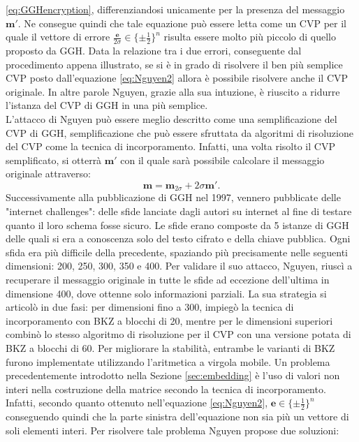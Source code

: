 \ref{eq:GGHencryption}, differenziandosi unicamente per la presenza del messaggio $\mathbf{m}'$.
Ne consegue quindi che tale equazione può essere letta come un CVP per il quale il vettore di 
errore $\frac{\mathbf{e}}{2\sigma} \in \{\pm\frac{1}{2}\}^n$ risulta essere molto più piccolo
di quello proposto da GGH. Data la relazione tra i due errori, conseguente dal procedimento appena
illustrato, se si è in grado di risolvere il ben più semplice CVP posto dall'equazione 
\ref{eq:Nguyen2} allora è possibile risolvere anche il CVP originale. In altre parole 
Nguyen, grazie alla sua intuzione, è riuscito a ridurre l'istanza del CVP di GGH in una più
semplice. \\
L'attacco di Nguyen può essere meglio descritto come una semplificazione del CVP di GGH, 
semplificazione che può essere sfruttata da algoritmi di risoluzione del CVP come la 
tecnica di incorporamento. Infatti, una volta risolto il CVP semplificato, si otterrà 
$\mathbf{m}'$ con il quale sarà possibile calcolare il messaggio originale attraverso: 
\[
    \mathbf{m} = \mathbf{m}_{2\sigma} + 2\sigma\mathbf{m}'.
\] 
Successivamente alla pubblicazione di GGH nel 1997, vennero
pubblicate delle "internet challenges": delle sfide lanciate dagli autori su internet
al fine di testare quanto il loro schema fosse sicuro. Le sfide erano composte da 5 istanze di GGH
delle quali si era a conoscenza solo del testo cifrato e della chiave pubblica. Ogni sfida 
era più difficile della precedente, spaziando più precisamente nelle seguenti dimensioni: 
200, 250, 300, 350 e 400. Per validare il suo attacco, Nguyen, riuscì a recuperare il messaggio 
originale in tutte le sfide ad eccezione dell'ultima in dimensione 400, dove ottenne solo informazioni 
parziali. La sua strategia si articolò in due fasi: per dimensioni fino a 300, impiegò la 
tecnica di incorporamento con BKZ a blocchi di 20, mentre per le dimensioni superiori combinò lo stesso 
algoritmo di risoluzione per il CVP con una versione potata di BKZ a blocchi di 60. Per migliorare la 
stabilità, entrambe le varianti di BKZ furono implementate utilizzando l'aritmetica a 
virgola mobile. Un problema precedentemente introdotto nella Sezione \ref{sec:embedding} 
è l'uso di valori non interi nella costruzione della matrice secondo la tecnica di incorporamento. 
Infatti, secondo quanto ottenuto nell'equazione \ref{eq:Nguyen2}, 
$\mathbf{e} \in \{\pm\frac{1}{2}\}^n$ conseguendo quindi che la parte sinistra dell'equazione
non sia più un vettore di soli elementi interi. Per risolvere tale problema Nguyen propose
due soluzioni:
